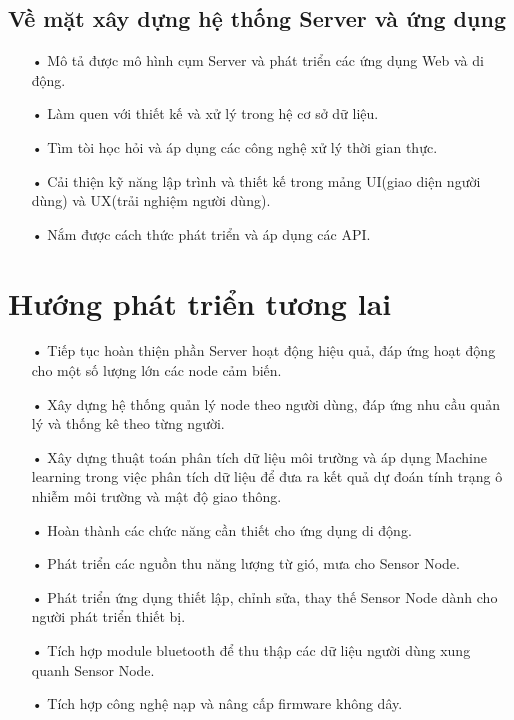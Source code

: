 \subsection{Về mặt xây dựng hệ thống Server và ứng dụng}
\begin{itemize}
	\item[•] Mô tả được mô hình cụm Server và phát triển các ứng dụng Web và di động.
	\item[•] Làm quen với thiết kế và xử lý trong hệ cơ sở dữ liệu.
	\item[•] Tìm tòi học hỏi và áp dụng các công nghệ xử lý thời gian thực.
	\item[•] Cải thiện kỹ năng lập trình và thiết kế trong mảng UI(giao diện người dùng) và UX(trải nghiệm người dùng).
	\item[•] Nắm được cách thức phát triển và áp dụng các API.
\end{itemize}
\section{Hướng phát triển tương lai}
\begin{itemize}
\item[•] Tiếp tục hoàn thiện phần Server hoạt động hiệu quả, đáp ứng hoạt động cho một số lượng lớn các node cảm biến.
\item[•] Xây dựng hệ thống quản lý node theo người dùng, đáp ứng nhu cầu quản lý và thống kê theo từng người.
\item[•] Xây dựng thuật toán phân tích dữ liệu môi trường và áp dụng Machine learning trong việc phân tích dữ liệu để đưa ra kết quả dự đoán tính trạng ô nhiễm môi trường và mật độ giao thông.
\item[•] Hoàn thành các chức năng cần thiết cho ứng dụng di động.
\item[•] Phát triển các nguồn thu năng lượng từ gió, mưa cho Sensor Node.
\item[•] Phát triển ứng dụng thiết lập, chỉnh sửa, thay thế Sensor Node dành cho người phát triển thiết bị.
\item[•] Tích hợp module bluetooth để thu thập các dữ liệu người dùng xung quanh Sensor Node.
\item[•] Tích hợp công nghệ nạp và nâng cấp firmware không dây.
\end{itemize}
